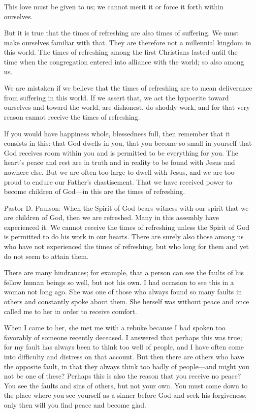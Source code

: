 This love must be given to us; we cannot merit it or force it forth within ourselves.

But it is true that the times of refreshing are also times of suffering. We must make ourselves familiar with that. They are therefore not a millennial kingdom in this world. The times of refreshing among the first Christians lasted until the time when the congregation entered into alliance with the world; so also among us.

We are mistaken if we believe that the times of refreshing are to mean deliverance from suffering in this world. If we assert that, we act the hypocrite toward ourselves and toward the world, are dishonest, do shoddy work, and for that very reason cannot receive the times of refreshing.

If you would have happiness whole, blessedness full, then remember that it consists in this: that God dwells in you, that you become so small in yourself that God receives room within you and is permitted to be everything for you. The heart’s peace and rest are in truth and in reality to be found with Jesus and nowhere else. But we are often too large to dwell with Jesus, and we are too proud to endure our Father’s chastisement. That we have received power to become children of God—in this are the times of refreshing.

Pastor D. Paulson: When the Spirit of God bears witness with our spirit that we are children of God, then we are refreshed. Many in this assembly have experienced it. We cannot receive the times of refreshing unless the Spirit of God is permitted to do his work in our hearts. There are surely also those among us who have not experienced the times of refreshing, but who long for them and yet do not seem to attain them.

There are many hindrances; for example, that a person can see the faults of his fellow human beings so well, but not his own. I had occasion to see this in a woman not long ago. She was one of those who always found so many faults in others and constantly spoke about them. She herself was without peace and once called me to her in order to receive comfort.

When I came to her, she met me with a rebuke because I had spoken too favorably of someone recently deceased. I answered that perhaps this was true; for my fault has always been to think too well of people, and I have often come into difficulty and distress on that account. But then there are others who have the opposite fault, in that they always think too badly of people—and might you not be one of these? Perhaps this is also the reason that you receive no peace? You see the faults and sins of others, but not your own. You must come down to the place where you see yourself as a sinner before God and seek his forgiveness; only then will you find peace and become glad.

